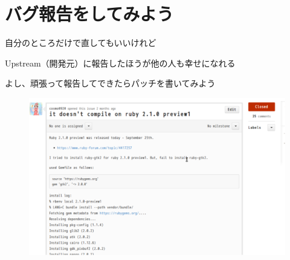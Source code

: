 \section{バグ報告をしてみよう}
\begin{frame}
\begin{itemize}
{\Large
\item 自分のところだけで直してもいいけれど
\item Upstream（開発元）に報告したほうが他の人も幸せになれる
\item よし、頑張って報告してできたらパッチを書いてみよう
}
\end{itemize}
\end{frame}

\begin{frame}
\begin{figure}
  \includegraphics[width=12cm]{img/issue180.pdf}
\end{figure}
\end{frame}
